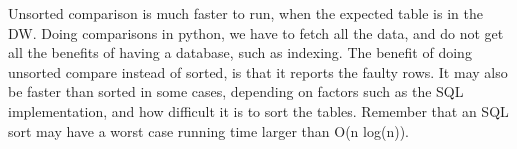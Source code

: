 Unsorted comparison is much faster to run, when the expected table is in the DW. Doing comparisons in python, we have to fetch all the data, and do not get all the benefits of having a database, such as indexing. The benefit of doing unsorted compare instead of sorted, is that it reports the faulty rows. It may also be faster than sorted in some cases, depending on factors such as the SQL implementation, and how difficult it is to sort the tables. Remember that an SQL sort may have a worst case running time larger than  O(n log(n)).


